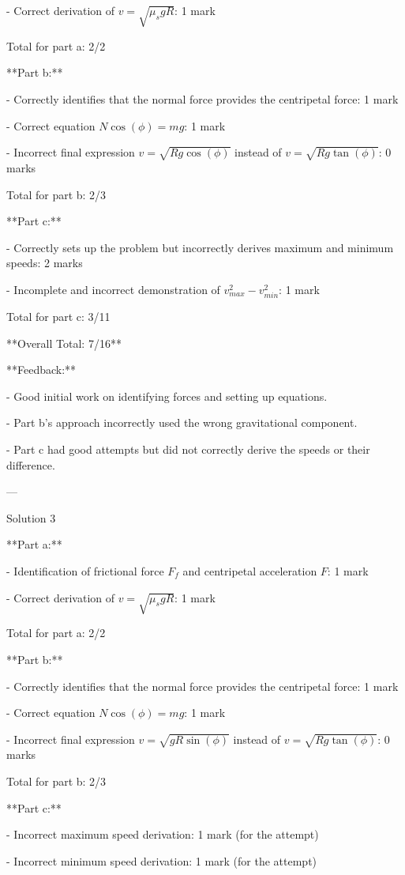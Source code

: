 \documentclass[a4paper,11pt]{article}
\begin{document}
- Correct derivation of \(v = \sqrt{\mu_s g R}\): 1 mark

Total for part a: 2/2

**Part b:**

- Correctly identifies that the normal force provides the centripetal force: 1 mark

- Correct equation \(N \cos(\phi) = mg\): 1 mark

- Incorrect final expression \(v = \sqrt{Rg\cos(\phi)}\) instead of \(v = \sqrt{Rg\tan(\phi)}\): 0 marks

Total for part b: 2/3

**Part c:**

- Correctly sets up the problem but incorrectly derives maximum and minimum speeds: 2 marks

- Incomplete and incorrect demonstration of \(v_{max}^{2} - v_{min}^{2}\): 1 mark

Total for part c: 3/11

**Overall Total: 7/16**

**Feedback:**

- Good initial work on identifying forces and setting up equations.

- Part b's approach incorrectly used the wrong gravitational component.

- Part c had good attempts but did not correctly derive the speeds or their difference.

---

Solution 3

**Part a:**

- Identification of frictional force \(F_f\) and centripetal acceleration \(F\): 1 mark

- Correct derivation of \(v = \sqrt{\mu_s g R}\): 1 mark

Total for part a: 2/2

**Part b:**

- Correctly identifies that the normal force provides the centripetal force: 1 mark

- Correct equation \(N \cos(\phi) = mg\): 1 mark

- Incorrect final expression \(v = \sqrt{gR\sin(\phi)}\) instead of \(v = \sqrt{Rg\tan(\phi)}\): 0 marks

Total for part b: 2/3

**Part c:**

- Incorrect maximum speed derivation: 1 mark (for the attempt)

- Incorrect minimum speed derivation: 1 mark (for the attempt)
\end{document}
